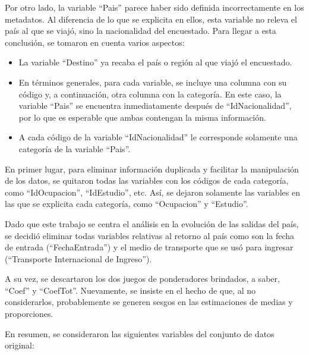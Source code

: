 \documentclass[
]{article}
\providecommand{\tightlist}{%
  \setlength{\itemsep}{0pt}\setlength{\parskip}{0pt}}
\begin{document}
Por otro lado, la variable ``Pais'' parece haber sido definida
incorrectamente en los metadatos. Al diferencia de lo que se explicita
en ellos, esta variable no releva el país al que se viajó, sino la
nacionalidad del encuestado. Para llegar a esta conclusión, se tomaron
en cuenta varios aspectos:

\begin{itemize}
\tightlist
\item
  La variable ``Destino'' ya recaba el país o región al que viajó el
  encuestado.
\item
  En términos generales, para cada variable, se incluye una columna con
  su código y, a continuación, otra columna con la categoría. En este
  caso, la variable ``Pais'' se encuentra inmediatamente después de
  ``IdNacionalidad'', por lo que es esperable que ambas contengan la
  misma información.
\item
  A cada código de la variable ``IdNacionalidad'' le corresponde
  solamente una categoría de la variable ``Pais''.
\end{itemize}

En primer lugar, para eliminar información duplicada y facilitar la
manipulación de los datos, se quitaron todas las variables con los
códigos de cada categoría, como ``IdOcupacion'', ``IdEstudio'', etc.
Así, se dejaron solamente las variables en las que se explicita cada
categoría, como ``Ocupacion'' y ``Estudio''.

Dado que este trabajo se centra el análisis en la evolución de las
salidas del país, se decidió eliminar todas variables relativas al
retorno al país como son la fecha de entrada (``FechaEntrada'') y el
medio de transporte que se usó para ingresar (``Transporte Internacional
de Ingreso'').

A su vez, se descartaron los dos juegos de ponderadores brindados, a
saber, ``Coef'' y ``CoefTot''. Nuevamente, se insiste en el hecho de
que, al no considerarlos, probablemente se generen sesgos en las
estimaciones de medias y proporciones.

En resumen, se consideraron las siguientes variables del conjunto de
datos original:
\end{document}
